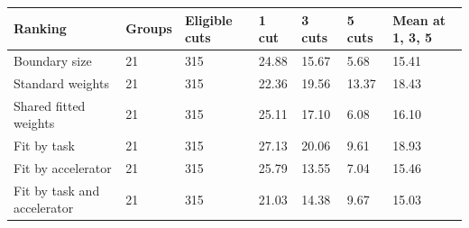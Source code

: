 \begin{tabular}{@{}lllllll@{}}
\toprule
Ranking & Groups & Eligible cuts & 1 cut & 3 cuts & 5 cuts & Mean at 1, 3, 5 \\
\midrule
Boundary size & 21 & 315 & 24.88 & 15.67 & 5.68 & 15.41 \\
Standard weights & 21 & 315 & 22.36 & 19.56 & 13.37 & 18.43 \\
Shared fitted weights & 21 & 315 & 25.11 & 17.10 & 6.08 & 16.10 \\
Fit by task & 21 & 315 & 27.13 & 20.06 & 9.61 & 18.93 \\
Fit by accelerator & 21 & 315 & 25.79 & 13.55 & 7.04 & 15.46 \\
Fit by task and accelerator & 21 & 315 & 21.03 & 14.38 & 9.67 & 15.03 \\
\bottomrule
\end{tabular}
